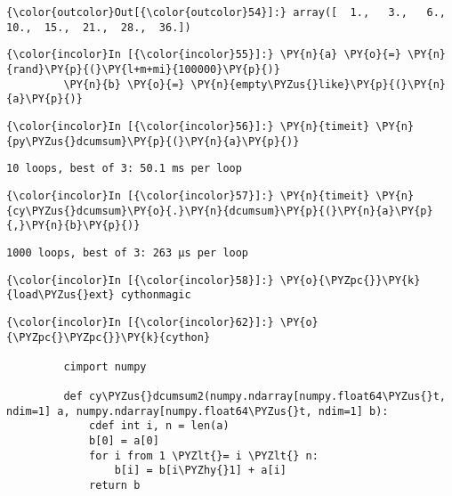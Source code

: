             \begin{Verbatim}[commandchars=\\\{\}]
{\color{outcolor}Out[{\color{outcolor}54}]:} array([  1.,   3.,   6.,  10.,  15.,  21.,  28.,  36.])
\end{Verbatim}
        
    \begin{Verbatim}[commandchars=\\\{\}]
{\color{incolor}In [{\color{incolor}55}]:} \PY{n}{a} \PY{o}{=} \PY{n}{rand}\PY{p}{(}\PY{l+m+mi}{100000}\PY{p}{)}
         \PY{n}{b} \PY{o}{=} \PY{n}{empty\PYZus{}like}\PY{p}{(}\PY{n}{a}\PY{p}{)}
\end{Verbatim}

    \begin{Verbatim}[commandchars=\\\{\}]
{\color{incolor}In [{\color{incolor}56}]:} \PY{n}{timeit} \PY{n}{py\PYZus{}dcumsum}\PY{p}{(}\PY{n}{a}\PY{p}{)}
\end{Verbatim}

    \begin{Verbatim}[commandchars=\\\{\}]
10 loops, best of 3: 50.1 ms per loop

    \end{Verbatim}

    \begin{Verbatim}[commandchars=\\\{\}]
{\color{incolor}In [{\color{incolor}57}]:} \PY{n}{timeit} \PY{n}{cy\PYZus{}dcumsum}\PY{o}{.}\PY{n}{dcumsum}\PY{p}{(}\PY{n}{a}\PY{p}{,}\PY{n}{b}\PY{p}{)}
\end{Verbatim}

    \begin{Verbatim}[commandchars=\\\{\}]
1000 loops, best of 3: 263 µs per loop

    \end{Verbatim}





    \begin{Verbatim}[commandchars=\\\{\}]
{\color{incolor}In [{\color{incolor}58}]:} \PY{o}{\PYZpc{}}\PY{k}{load\PYZus{}ext} cythonmagic
\end{Verbatim}

    \begin{Verbatim}[commandchars=\\\{\}]
{\color{incolor}In [{\color{incolor}62}]:} \PY{o}{\PYZpc{}\PYZpc{}}\PY{k}{cython}
         
         cimport numpy
         
         def cy\PYZus{}dcumsum2(numpy.ndarray[numpy.float64\PYZus{}t, ndim=1] a, numpy.ndarray[numpy.float64\PYZus{}t, ndim=1] b):
             cdef int i, n = len(a)
             b[0] = a[0]
             for i from 1 \PYZlt{}= i \PYZlt{} n:
                 b[i] = b[i\PYZhy{}1] + a[i]
             return b
\end{Verbatim}

